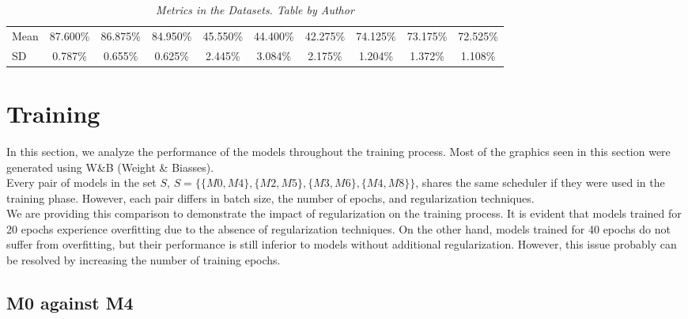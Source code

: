 \begin{landscape}
\begin{table}
\begin{tabular}{lccccccccc}
      \midrule

      \cellcolor{gray!50}Mean & \cellcolor{gray!50}87.600\% & \cellcolor{gray!50}86.875\% & \cellcolor{gray!50}84.950\% & \cellcolor{gray!50}45.550\% & \cellcolor{gray!50}44.400\% & \cellcolor{gray!50}42.275\% & \cellcolor{gray!50}74.125\% & \cellcolor{gray!50}73.175\% & \cellcolor{gray!50}72.525\% \\
      \cellcolor{gray!50}SD & \cellcolor{gray!50}0.787\% & \cellcolor{gray!50}0.655\% & \cellcolor{gray!50}0.625\% & \cellcolor{gray!50}2.445\% & \cellcolor{gray!50}3.084\% & \cellcolor{gray!50}2.175\% & \cellcolor{gray!50}1.204\% & \cellcolor{gray!50}1.372\% &  \cellcolor{gray!50}1.108\% \\

      \bottomrule
    \end{tabular}
    \caption[Metrics in the Datasets]
    {\textit{Metrics in the Datasets. Table by Author}}
    {\label{table:resume-metrics}}
  \end{table}

\end{landscape}


\section{Training}

In this section, we analyze the performance of the models throughout the
training process. Most of the graphics seen in this section were generated
using W\&B (Weight \& Biasses).\\


Every pair of models in the set \(S\), \(S=\{\{M0, M4\}, \{M2, M5\}, \{M3,
M6\}, \{M4, M8\}\}\), shares the same scheduler if they were used in the
training phase. However, each pair differs in batch size, the number of epochs,
and regularization techniques. \\

We are providing this comparison to demonstrate the impact of regularization on
the training process. It is evident that models trained for 20 epochs
experience overfitting due to the absence of regularization techniques. On the
other hand, models trained for 40 epochs do not suffer from overfitting, but
their performance is still inferior to models without additional
regularization. However, this issue probably can be resolved by increasing the
number of training epochs.

\subsection{M0 against M4}

